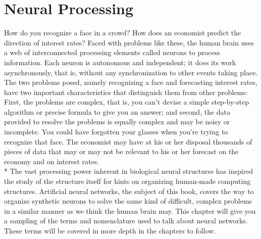 \section{Neural Processing}
How do you recognize a face in a crowd? How does an economist predict the
direction of interest rates? Faced with problems like these, the human brain
uses a web of interconnected processing elements called neurons to process
information. Each neuron is autonomous and independent; it does its work
asynchronously, that is, without any synchronization to other events taking
place. The two problems posed, namely recognizing a face and forecasting
interest rates, have two important characteristics that distinguish them from
other problems: First, the problems are complex, that is, you can’t devise a
simple step-by-step algorithm or precise formula to give you an answer; and
second, the data provided to resolve the problems is equally complex and may
be noisy or incomplete. You could have forgotten your glasses when you’re
trying to recognize that face. The economist may have at his or her disposal
thousands of pieces of data that may or may not be relevant to his or her
forecast on the economy and on interest rates. \\*
The vast processing power inherent in biological neural structures has inspired
the study of the structure itself for hints on organizing human-made computing
structures. Artificial neural networks, the subject of this book, covers the way
to organize synthetic neurons to solve the same kind of difficult, complex
problems in a similar manner as we think the human brain may. This chapter
will give you a sampling of the terms and nomenclature used to talk about
neural networks. These terms will be covered in more depth in the chapters to
follow.
